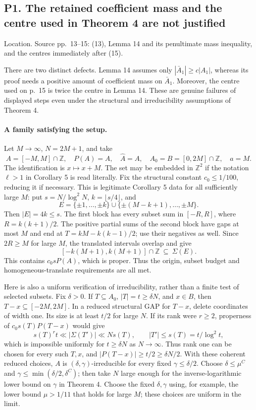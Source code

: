 \documentclass[10pt]{article}
\begin{document}
\subsection*{P1. The retained coefficient mass and the centre used in Theorem 4 are not justified}
Location. Source pp. 13–15: (13), Lemma 14 and its penultimate mass inequality, and the centres immediately after (15).\par
There are two distinct defects. Lemma 14 assumes only \(|\bar A_1|\ge c|A_1|\), whereas its proof needs a positive amount of coefficient mass on \(\bar A_1\). Moreover, the centre used on p. 15 is twice the centre in Lemma 14. These are genuine failures of displayed steps even under the structural and irreducibility assumptions of Theorem 4.\par
\paragraph*{A family satisfying the setup.}\mbox{}\par
Let \(M\to\infty\), \(N=2M+1\), and take \[A=[-M,M]\cap\mathbb Z,\quad P(A)=A,\quad \widehat A=A,
 \quad A_0=B=[0,2M]\cap\mathbb Z,\quad a=M.\] The identification is \(x\mapsto x+M\). The set may be embedded in \(\mathbb Z^2\) if the notation \(\ell>1\) in Corollary 5 is read literally. Fix the structural constant \(c_0\le1/100\), reducing it if necessary. This is legitimate Corollary 5 data for all sufficiently large \(M\): put \(s=N/\log^2N\), \(k=\lfloor s/4\rfloor\), and \[E=\{\pm1,\ldots,\pm k\}\cup
   \{\pm(M-k+1),\ldots,\pm M\}.\] Then \(|E|=4k\le s\). The first block has every subset sum in \([-R,R]\), where \(R=k(k+1)/2\). The positive partial sums of the second block have gaps at most \(M\) and end at \(T=kM-k(k-1)/2\); use their negatives as well. Since \(2R\ge M\) for large \(M\), the translated intervals overlap and give \[[-k(M+1),k(M+1)]\cap\mathbb Z\ \subseteq\ \Sigma(E).\] This contains \(c_0sP(A)\), which is proper. Thus the origin, subset budget and homogeneous-translate requirements are all met.\par
Here is also a uniform verification of irreducibility, rather than a finite test of selected subsets. Fix \(\delta>0\). If \(T\subseteq A_0\), \(|T|=t\ge\delta N\), and \(x\in B\), then \(T-x\subseteq[-2M,2M]\). In a reduced structural GAP for \(T-x\), delete coordinates of width one. Its size is at least \(t/2\) for large \(N\). If its rank were \(r\ge2\), properness of \(c_0s(T)P(T-x)\) would give \[s(T)^r t\ll |\Sigma(T')|\ll Ns(T),\qquad
 |T'|\le s(T)=t/\log^2t,\] which is impossible uniformly for \(t\ge\delta N\) as \(N\to\infty\). Thus rank one can be chosen for every such \(T,x\), and \(|P(T-x)|\ge t/2\ge\delta N/2\). With these coherent reduced choices, \(A\) is \((\delta,\gamma)\)-irreducible for every fixed \(\gamma\le\delta/2\). Choose \(\delta\le\mu^C\) and \(\gamma\le\min(\delta/2,\delta^C)\); then take \(N\) large enough for the inverse-logarithmic lower bound on \(\gamma\) in Theorem 4. Choose the fixed \(\delta,\gamma\) using, for example, the lower bound \(\mu>1/11\) that holds for large \(M\); these choices are uniform in the limit.\par
\end{document}
